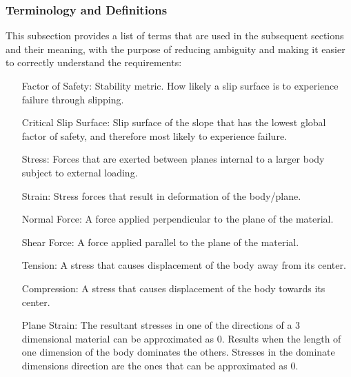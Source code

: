 \documentclass[12pt]{article}
\begin{document}
\subsubsection{Terminology and Definitions}
\label{Sec:TermandDefi}
This subsection provides a list of terms that are used in the subsequent sections and their meaning, with the purpose of reducing ambiguity and making it easier to correctly understand the requirements:
\begin{itemize}
\item[Factor of Safety:]Stability metric. How likely a slip surface is to experience failure through slipping.
\item[Critical Slip Surface:]Slip surface of the slope that has the lowest global factor of safety, and therefore most likely to experience failure.
\item[Stress:]Forces that are exerted between planes internal to a larger body subject to external loading.
\item[Strain:]Stress forces that result in deformation of the body/plane.
\item[Normal Force:]A force applied perpendicular to the plane of the material.
\item[Shear Force:]A force applied parallel to the plane of the material.
\item[Tension:]A stress that causes displacement of the body away from its center.
\item[Compression:]A stress that causes displacement of the body towards its center.
\item[Plane Strain:]The resultant stresses in one of the directions of a 3 dimensional material can be approximated as 0. Results when the length of one dimension of the body dominates the others. Stresses in the dominate dimensions direction are the ones that can be approximated as 0.
\end{itemize}
\end{document}
